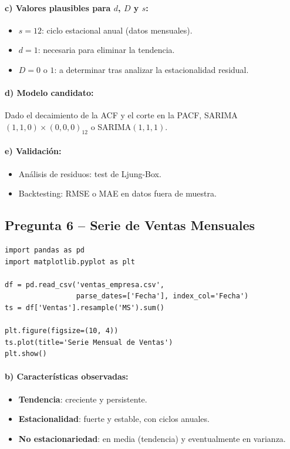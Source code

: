 \documentclass[12pt, a4paper]{article}
\begin{document}
\paragraph{c) Valores plausibles para $d$, $D$ y $s$:}
\begin{itemize}
  \item $s = 12$: ciclo estacional anual (datos mensuales).
  \item $d = 1$: necesaria para eliminar la tendencia.
  \item $D = 0$ o $1$: a determinar tras analizar la estacionalidad residual.
\end{itemize}

\paragraph{d) Modelo candidato:}
Dado el decaimiento de la ACF y el corte en la PACF,
SARIMA$(1,1,0)\times(0,0,0)_{12}$ o SARIMA$(1,1,1)$.

\paragraph{e) Validación:}
\begin{itemize}
  \item Análisis de residuos: test de Ljung-Box.
  \item Backtesting: RMSE o MAE en datos fuera de muestra.
\end{itemize}

\subsection{Pregunta 6 -- Serie de Ventas Mensuales}

\begin{lstlisting}
import pandas as pd
import matplotlib.pyplot as plt

df = pd.read_csv('ventas_empresa.csv',
                 parse_dates=['Fecha'], index_col='Fecha')
ts = df['Ventas'].resample('MS').sum()

plt.figure(figsize=(10, 4))
ts.plot(title='Serie Mensual de Ventas')
plt.show()
\end{lstlisting}

\paragraph{b) Características observadas:}
\begin{itemize}
  \item \textbf{Tendencia}: creciente y persistente.
  \item \textbf{Estacionalidad}: fuerte y estable, con ciclos anuales.
  \item \textbf{No estacionariedad}: en media (tendencia) y eventualmente
        en varianza.
\end{itemize}
\end{document}
